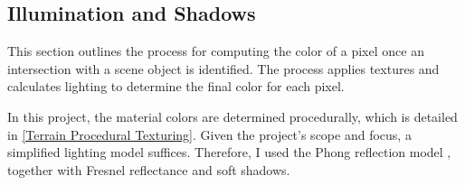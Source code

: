\subsection{Illumination and Shadows}

This section outlines the process for computing the color of a pixel once an intersection with a scene object is identified. The process applies textures and calculates lighting to determine the final color for each pixel.

In this project, the material colors are determined procedurally, which is detailed in \ref{Terrain Procedural Texturing}. Given the project's scope and focus, a simplified lighting model suffices. Therefore, I used the Phong reflection model \cite{phong_illumination_1975}, together with Fresnel reflectance and soft shadows.






    
